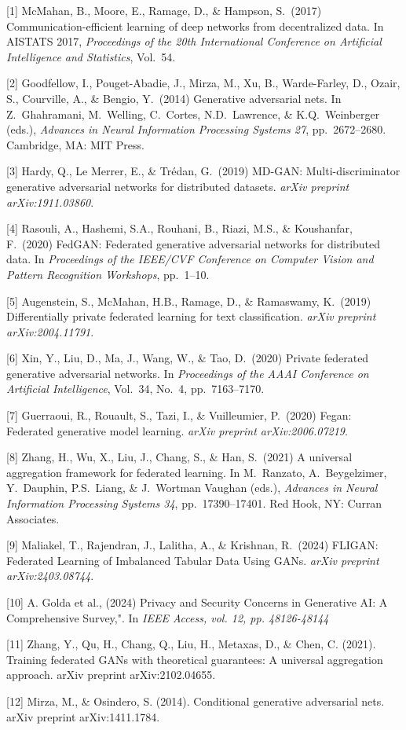 \documentclass{article}
\begin{document}
{
\small
[1] McMahan, B., Moore, E., Ramage, D., \& Hampson, S.\ (2017) Communication-efficient learning of deep networks from decentralized data. In AISTATS 2017, {\it Proceedings of the 20th International Conference on Artificial Intelligence and Statistics}, Vol.\ 54.

[2] Goodfellow, I., Pouget-Abadie, J., Mirza, M., Xu, B., Warde-Farley, D., Ozair, S., Courville, A., \& Bengio, Y.\ (2014) Generative adversarial nets. In Z.\ Ghahramani, M.\ Welling, C.\ Cortes, N.D.\ Lawrence, \& K.Q.\ Weinberger (eds.), {\it Advances in Neural Information Processing Systems 27}, pp.\ 2672--2680. Cambridge, MA: MIT Press.

[3] Hardy, Q., Le Merrer, E., \& Trédan, G.\ (2019) MD-GAN: Multi-discriminator generative adversarial networks for distributed datasets. {\it arXiv preprint arXiv:1911.03860}.

[4] Rasouli, A., Hashemi, S.A., Rouhani, B., Riazi, M.S., \& Koushanfar, F.\ (2020) FedGAN: Federated generative adversarial networks for distributed data. In {\it Proceedings of the IEEE/CVF Conference on Computer Vision and Pattern Recognition Workshops}, pp.\ 1--10.

[5] Augenstein, S., McMahan, H.B., Ramage, D., \& Ramaswamy, K.\ (2019) Differentially private federated learning for text classification. {\it arXiv preprint arXiv:2004.11791}.

[6] Xin, Y., Liu, D., Ma, J., Wang, W., \& Tao, D.\ (2020) Private federated generative adversarial networks. In {\it Proceedings of the AAAI Conference on Artificial Intelligence}, Vol.\ 34, No.\ 4, pp.\ 7163--7170.

[7] Guerraoui, R., Rouault, S., Tazi, I., \& Vuilleumier, P.\ (2020) Fegan: Federated generative model learning. {\it arXiv preprint arXiv:2006.07219}.

[8] Zhang, H., Wu, X., Liu, J., Chang, S., \& Han, S.\ (2021) A universal aggregation framework for federated learning. In M.\ Ranzato, A.\ Beygelzimer, Y.\ Dauphin, P.S.\ Liang, \& J.\ Wortman Vaughan (eds.), {\it Advances in Neural Information Processing Systems 34}, pp.\ 17390--17401. Red Hook, NY: Curran Associates.

[9] Maliakel, T., Rajendran, J., Lalitha, A., \& Krishnan, R.\ (2024) FLIGAN: Federated Learning of Imbalanced Tabular Data Using GANs. {\it arXiv preprint arXiv:2403.08744}.

[10] A. Golda et al., (2024) Privacy and Security Concerns in Generative AI: A Comprehensive Survey,". In \it{IEEE Access, vol. 12, pp. 48126-48144}

[11] Zhang, Y., Qu, H., Chang, Q., Liu, H., Metaxas, D., & Chen, C. (2021). Training federated GANs with theoretical guarantees: A universal aggregation approach. arXiv preprint arXiv:2102.04655.

[12] Mirza, M., & Osindero, S. (2014). Conditional generative adversarial nets. arXiv preprint arXiv:1411.1784.
}
\end{document}
